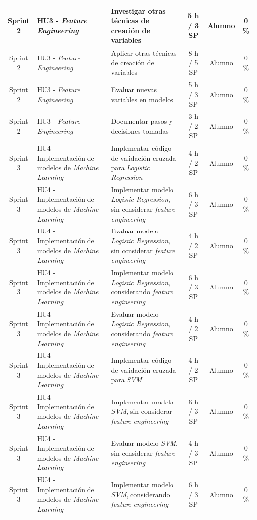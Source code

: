 \documentclass[
11pt, %
]{charter}
\begin{document}
\begin{xltabular}{\linewidth}{@{}|c|X|X|c|c|c|@{}}
Sprint 2 & HU3 - \textit{Feature Engineering}  & Investigar otras técnicas de creación de variables & 5 h / 3 SP & Alumno & 0 \% \\ \hline
Sprint 2 & HU3 - \textit{Feature Engineering}  & Aplicar otras técnicas de creación de variables  & 8 h / 5 SP & Alumno & 0 \%\\ \hline
Sprint 2 & HU3 - \textit{Feature Engineering}  & Evaluar nuevas variables en modelos  & 5 h / 3 SP & Alumno & 0 \%\\ \hline
Sprint 2 & HU3 - \textit{Feature Engineering}  & Documentar pasos y decisiones tomadas  & 3 h / 2 SP & Alumno & 0 \%\\ \hline
Sprint 3 & HU4 - Implementación de modelos de \textit{Machine Learning} & Implementar código de validación cruzada para \textit{Logistic Regression}  & 4 h / 2 SP & Alumno & 0 \% \\ \hline
Sprint 3 & HU4 - Implementación de modelos de \textit{Machine Learning} & Implementar modelo \textit{Logistic Regression}, sin considerar \textit{feature engineering} & 6 h / 3 SP & Alumno & 0 \%\\ \hline
Sprint 3 & HU4 - Implementación de modelos de \textit{Machine Learning} & Evaluar modelo \textit{Logistic Regression}, sin considerar \textit{feature engineering}  & 4 h / 2 SP & Alumno & 0 \%\\ \hline
Sprint 3 & HU4 - Implementación de modelos de \textit{Machine Learning} & Implementar modelo \textit{Logistic Regression}, considerando \textit{feature engineering}  & 6 h / 3 SP & Alumno & 0 \%\\ \hline
Sprint 3 & HU4 - Implementación de modelos de \textit{Machine Learning} & Evaluar modelo \textit{Logistic Regression}, considerando \textit{feature engineering}  & 4 h / 2 SP & Alumno & 0 \%\\ \hline
Sprint 3 & HU4 - Implementación de modelos de \textit{Machine Learning} & Implementar código de validación cruzada para \textit{SVM}  & 4 h / 2 SP & Alumno & 0 \%\\ \hline
Sprint 3 & HU4 - Implementación de modelos de \textit{Machine Learning} & Implementar modelo \textit{SVM}, sin considerar \textit{feature engineering}  & 6 h / 3 SP & Alumno & 0 \%\\ \hline
Sprint 3 & HU4 - Implementación de modelos de \textit{Machine Learning} & Evaluar modelo \textit{SVM}, sin considerar \textit{feature engineering}  & 4 h / 3 SP & Alumno & 0 \%\\ \hline
Sprint 3 & HU4 - Implementación de modelos de \textit{Machine Learning} & Implementar modelo \textit{SVM}, considerando \textit{feature engineering}  & 6 h / 3 SP & Alumno & 0 \%\\ \hline

\end{xltabular}
\end{document}
